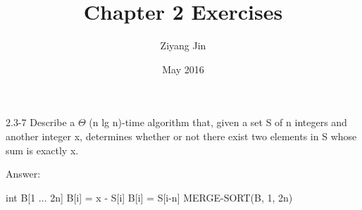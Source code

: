 \documentclass{article}
\title{Chapter 2 Exercises}
\author{Ziyang Jin}
\date{May 2016}
\begin{document}
2.3-7
Describe a $\Theta$ (n lg n)-time algorithm that, given a set S of n integers and another integer x, determines whether or not there exist two elements in S whose sum is exactly x.

Answer:
\begin{algorithm}
\begin{algorithmic}[1]
 
    \State int B[1 ... 2n]
        \State B[i] = x - S[i]
    \EndFor
        \State B[i] = S[i-n]
    \EndFor
    \State MERGE-SORT(B, 1, 2n)
        \EndIf
    \EndFor
\EndProcedure
\end{algorithmic}
\end{algorithm}  
\end{document}
